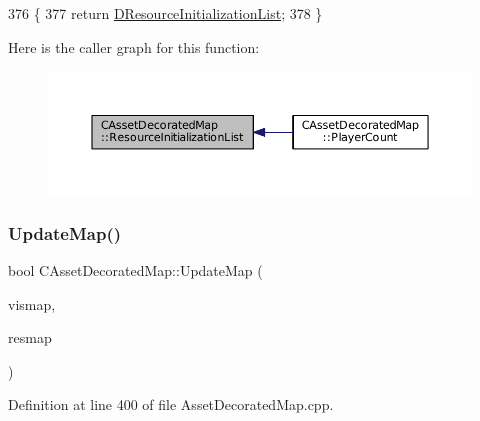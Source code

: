 \begin{DoxyCode}
376                                                                                                            
           \{
377     \textcolor{keywordflow}{return} \hyperlink{classCAssetDecoratedMap_ab4c78aeb90280ea98a3aa542cdb7f8cc}{DResourceInitializationList};
378 \}
\end{DoxyCode}
Here is the caller graph for this function\+:\nopagebreak
\begin{figure}[H]
\begin{center}
\leavevmode
\includegraphics[width=350pt]{classCAssetDecoratedMap_a279fb55e5536131b599275e8629d51cd_icgraph}
\end{center}
\end{figure}
\hypertarget{classCAssetDecoratedMap_a7b594b6bef2eed8bbb0e4e4e6b855903}{}\label{classCAssetDecoratedMap_a7b594b6bef2eed8bbb0e4e4e6b855903} 
\subsubsection{\texorpdfstring{Update\+Map()}{UpdateMap()}}
{\footnotesize\ttfamily bool C\+Asset\+Decorated\+Map\+::\+Update\+Map (\begin{DoxyParamCaption}\item[{const \hyperlink{classCVisibilityMap}{C\+Visibility\+Map} \&}]{vismap,  }\item[{const \hyperlink{classCAssetDecoratedMap}{C\+Asset\+Decorated\+Map} \&}]{resmap }\end{DoxyParamCaption})}



Definition at line 400 of file Asset\+Decorated\+Map.\+cpp.


